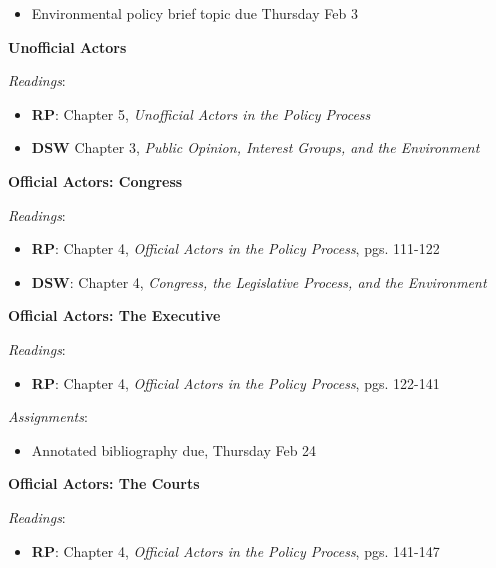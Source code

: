 \begin{itemize}

\item
  Environmental policy brief topic due Thursday Feb 3
\end{itemize}

\week \textbf{Unofficial Actors}

\emph{Readings}:

\begin{itemize}
\item
  \textbf{RP}: Chapter 5, \emph{Unofficial Actors in the Policy Process}
\item
  \textbf{DSW} Chapter 3, \emph{Public Opinion, Interest Groups, and the
  Environment}
\end{itemize}

\week \textbf{Official Actors: Congress}

\emph{Readings}:

\begin{itemize}
\item
  \textbf{RP}: Chapter 4, \emph{Official Actors in the Policy Process},
  pgs. 111-122
\item
  \textbf{DSW}: Chapter 4, \emph{Congress, the Legislative Process, and
  the Environment}
\end{itemize}

\week \textbf{Official Actors: The Executive}

\emph{Readings}:

\begin{itemize}

\item
  \textbf{RP}: Chapter 4, \emph{Official Actors in the Policy Process},
  pgs. 122-141
\end{itemize}

\vspace{0.10in}

\emph{Assignments}:

\begin{itemize}

\item
  Annotated bibliography due, Thursday Feb 24
\end{itemize}

\week \textbf{Official Actors: The Courts}

\emph{Readings}:

\begin{itemize}

\item
  \textbf{RP}: Chapter 4, \emph{Official Actors in the Policy Process},
  pgs. 141-147
\end{itemize}

